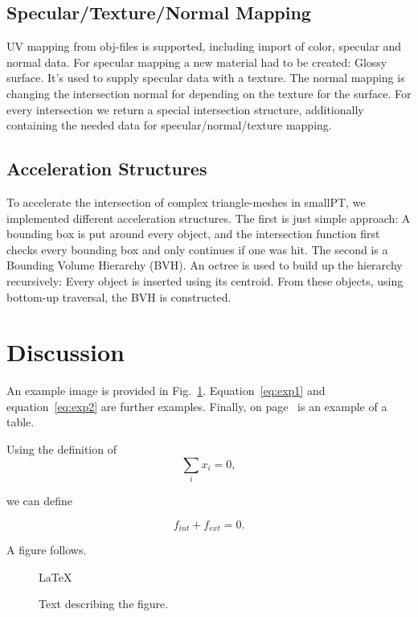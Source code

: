 \documentclass[11pt,a4paper]{article}
\begin{document}
\subsection{Specular/Texture/Normal Mapping}

UV mapping from obj-files is supported, including import of color, specular and normal data.
For specular mapping a new material had to be created: Glossy surface. It's used to supply specular data with a texture. The normal mapping is changing the intersection normal for depending on the texture for the surface. 
For every intersection we return a special intersection structure, additionally containing the needed data for specular/normal/texture mapping. 

\subsection{Acceleration Structures}

To accelerate the intersection of complex triangle-meshes in smallPT, we implemented different acceleration structures. 
The first is just simple approach: A bounding box is put around every object, and the intersection function first checks every bounding box and only continues if one was hit.
The second is a  Bounding Volume Hierarchy (BVH). An octree is used to build up the hierarchy recursively: Every object is inserted using its centroid. From these objects, using bottom-up traversal, the BVH is constructed. 

\section{Discussion}
\label{sec:discn}

An example image is provided in Fig.~\ref{fig:figure1}.
Equation~\eqref{eq:exp1} and equation~\eqref{eq:exp2} are further examples.
Finally, on page~\pageref{tab:table1} is an example of a table.

Using the definition of
\begin{equation}
  \label{eq:exp1}
  \sum\limits_{i} x_{i} = 0,
\end{equation}

we can define 

\begin{equation}
  \label{eq:exp2}
  f_{int} + f_{ext} = 0.
\end{equation}

A figure follows.

\begin{figure}[h!]
  \centering
  \LaTeX
  \caption{Text describing the figure.}
  \label{fig:figure1}
\end{figure}
\end{document}
